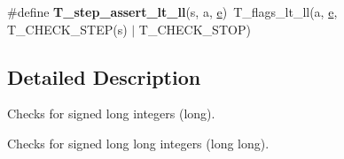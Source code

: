 \begin{DoxyCompactItemize}
\item 
\mbox{\label{group__RTEMSTestFrameworkChecksLong_ga2f300892660418d4501fba9d9465dac8}} 
\#define {\bfseries T\+\_\+step\+\_\+assert\+\_\+lt\+\_\+ll}(s,  a,  \mbox{\hyperlink{sun4u_2tte_8h_a8b0b9ed08e0e18920ec2682f48228c27}{e}})~T\+\_\+flags\+\_\+lt\+\_\+ll(a, \mbox{\hyperlink{sun4u_2tte_8h_a8b0b9ed08e0e18920ec2682f48228c27}{e}}, T\+\_\+\+C\+H\+E\+C\+K\+\_\+\+S\+T\+EP(s) $\vert$ T\+\_\+\+C\+H\+E\+C\+K\+\_\+\+S\+T\+OP)
\end{DoxyCompactItemize}


\subsection{Detailed Description}
Checks for signed long integers (long). 

Checks for signed long long integers (long long).